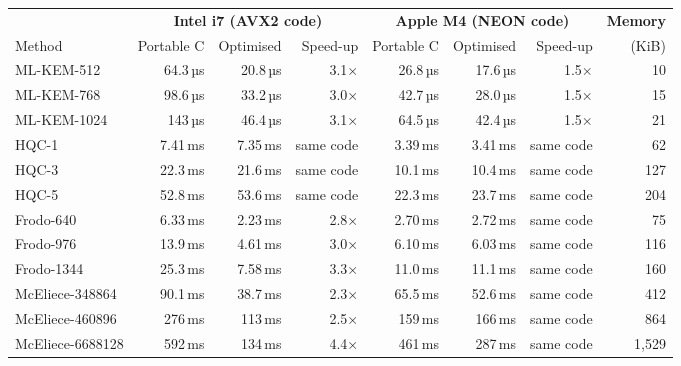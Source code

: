 \begin{tabular}{lrrrrrrr}
\toprule
 & \multicolumn{3}{c}{\textbf{Intel i7 (AVX2 code)}} & \multicolumn{3}{c}{\textbf{Apple M4 (NEON code)}} & \textbf{Memory} \\ \cmidrule(lr){2-4}\cmidrule(lr){5-7}\cmidrule(lr){8-8}
Method & Portable C & Optimised & Speed-up & Portable C & Optimised & Speed-up & (KiB) \\
\midrule
ML-KEM-512 & 64.3\,µs & 20.8\,µs & 3.1× & 26.8\,µs & 17.6\,µs & 1.5× & 10 \\
ML-KEM-768 & 98.6\,µs & 33.2\,µs & 3.0× & 42.7\,µs & 28.0\,µs & 1.5× & 15 \\
ML-KEM-1024 & 143\,µs & 46.4\,µs & 3.1× & 64.5\,µs & 42.4\,µs & 1.5× & 21 \\
\midrule
HQC-1 & 7.41\,ms & 7.35\,ms & same code & 3.39\,ms & 3.41\,ms & same code & 62 \\
HQC-3 & 22.3\,ms & 21.6\,ms & same code & 10.1\,ms & 10.4\,ms & same code & 127 \\
HQC-5 & 52.8\,ms & 53.6\,ms & same code & 22.3\,ms & 23.7\,ms & same code & 204 \\
\midrule
Frodo-640 & 6.33\,ms & 2.23\,ms & 2.8× & 2.70\,ms & 2.72\,ms & same code & 75 \\
Frodo-976 & 13.9\,ms & 4.61\,ms & 3.0× & 6.10\,ms & 6.03\,ms & same code & 116 \\
Frodo-1344 & 25.3\,ms & 7.58\,ms & 3.3× & 11.0\,ms & 11.1\,ms & same code & 160 \\
\midrule
McEliece-348864 & 90.1\,ms & 38.7\,ms & 2.3× & 65.5\,ms & 52.6\,ms & same code & 412 \\
McEliece-460896 & 276\,ms & 113\,ms & 2.5× & 159\,ms & 166\,ms & same code & 864 \\
McEliece-6688128 & 592\,ms & 134\,ms & 4.4× & 461\,ms & 287\,ms & same code & 1,529 \\
\bottomrule
\end{tabular}
